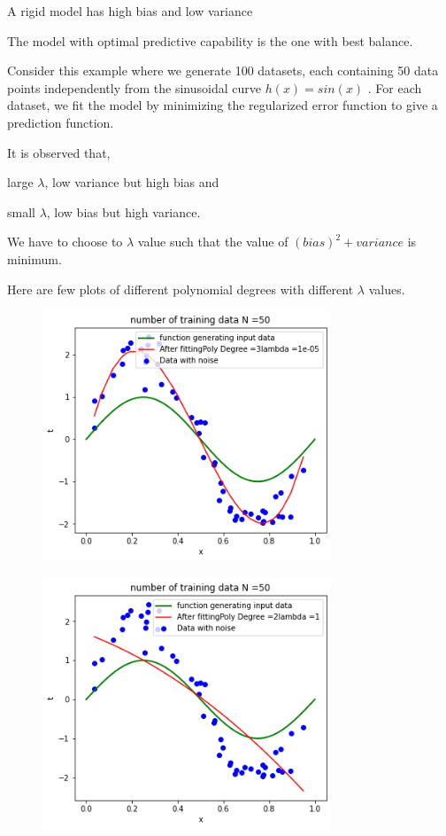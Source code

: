 \documentclass[journal,12pt,twocolumn]{IEEEtran}
\begin{document}
A rigid model has high bias and low variance

The model with optimal predictive capability is the one with best balance.

Consider this example where we generate 100 datasets, each containing 50 data points independently from the sinusoidal curve $h(x) = sin(x)$ . For each dataset, we fit the model by minimizing the regularized error function to give a prediction function.

It is observed that,

large $\lambda$, low variance but high bias and

small $\lambda$, low bias but high variance.

We have to choose to $\lambda$ value such that the value of $(bias)^2 + variance$ is minimum.

Here are few plots of different polynomial degrees with different $\lambda$ values.

\begin{figure}[!h]
\begin{center}
\includegraphics[width=3.4in]{figs/fig2.png}
\end{center}
\caption{}
\label{fig:2}
\end{figure}

\begin{figure}[!h]
\begin{center}
\includegraphics[width=3.4in]{figs/fig3.png}
\end{center}
\caption{}
\label{fig:3}
\end{figure}
\end{document}
